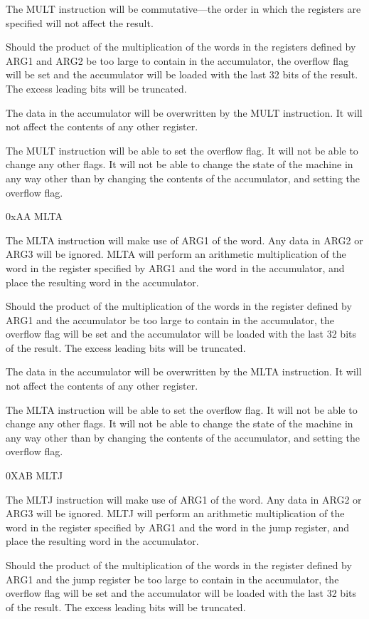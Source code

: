 \documentclass[]{article}
\begin{document}
The MULT instruction will be commutative---the order in which the
registers are specified will not affect the result.

Should the product of the multiplication of the words in the registers
defined by ARG1 and ARG2 be too large to contain in the accumulator, the
overflow flag will be set and the accumulator will be loaded with the
last 32 bits of the result. The excess leading bits will be truncated.

The data in the accumulator will be overwritten by the MULT instruction.
It will not affect the contents of any other register.

The MULT instruction will be able to set the overflow flag. It will not
be able to change any other flags. It will not be able to change the
state of the machine in any way other than by changing the contents of
the accumulator, and setting the overflow flag.

0xAA MLTA

The MLTA instruction will make use of ARG1 of the word. Any data in ARG2
or ARG3 will be ignored. MLTA will perform an arithmetic multiplication
of the word in the register specified by ARG1 and the word in the
accumulator, and place the resulting word in the accumulator.

Should the product of the multiplication of the words in the register
defined by ARG1 and the accumulator be too large to contain in the
accumulator, the overflow flag will be set and the accumulator will be
loaded with the last 32 bits of the result. The excess leading bits will
be truncated.

The data in the accumulator will be overwritten by the MLTA instruction.
It will not affect the contents of any other register.

The MLTA instruction will be able to set the overflow flag. It will not
be able to change any other flags. It will not be able to change the
state of the machine in any way other than by changing the contents of
the accumulator, and setting the overflow flag.

0XAB MLTJ

The MLTJ instruction will make use of ARG1 of the word. Any data in ARG2
or ARG3 will be ignored. MLTJ will perform an arithmetic multiplication
of the word in the register specified by ARG1 and the word in the jump
register, and place the resulting word in the accumulator.

Should the product of the multiplication of the words in the register
defined by ARG1 and the jump register be too large to contain in the
accumulator, the overflow flag will be set and the accumulator will be
loaded with the last 32 bits of the result. The excess leading bits will
be truncated.
\end{document}
